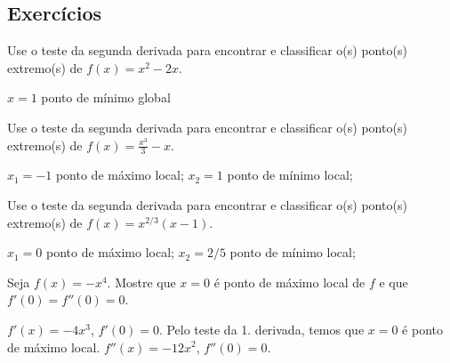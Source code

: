 \subsection*{Exercícios}

\begin{exer}
  Use o teste da segunda derivada para encontrar e classificar o(s) ponto(s) extremo(s) de $f(x) = x^2 - 2x$.
\end{exer}
\begin{resp}
  $x=1$ ponto de mínimo global
\end{resp}

\begin{exer}
  Use o teste da segunda derivada para encontrar e classificar o(s) ponto(s) extremo(s) de $\displaystyle f(x) = \frac{x^3}{3}-x$.
\end{exer}
\begin{resp}
  $x_1=-1$ ponto de máximo local; $x_2=1$ ponto de mínimo local;
\end{resp}

\begin{exer}
  Use o teste da segunda derivada para encontrar e classificar o(s) ponto(s) extremo(s) de $\displaystyle f(x) = x^{2/3}(x-1)$.
\end{exer}
\begin{resp}
  $x_1=0$ ponto de máximo local; $x_2=2/5$ ponto de mínimo local;
\end{resp}

\begin{exer}
  Seja $f(x) = -x^4$. Mostre que $x=0$ é ponto de máximo local de $f$ e que $f'(0) = f''(0) = 0$.
\end{exer}
\begin{resp}
  $f'(x) = -4x^3$, $f'(0)=0$. Pelo teste da 1. derivada, temos que $x=0$ é ponto de máximo local. $f''(x) = -12x^2$, $f''(0)=0$.
\end{resp}

